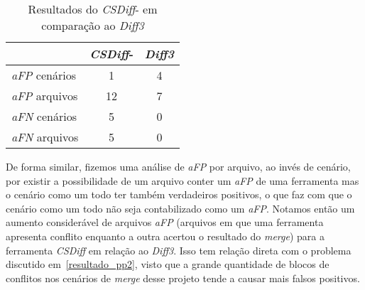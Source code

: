 \begin{table}[ht]
	\begin{center}
		\begin{tabular}{|l|c|c|}
			\hline
			\textbf{ }   & \textbf{\emph{CSDiff}-} & \textbf{\emph{Diff3}} \\
			\hline
			\emph{aFP} cenários & 1                & 4                     \\
			\emph{aFP} arquivos & 12               & 7                     \\
			\emph{aFN} cenários & 5                & 0                     \\
			\emph{aFN} arquivos & 5                & 0                     \\
			\hline
		\end{tabular}
	\end{center}
	\caption{Resultados do \emph{CSDiff}- em comparação ao \emph{Diff3}}\label{csdiff_minus_afp_afn}
\end{table}

De forma similar, fizemos uma análise de \emph{aFP} por arquivo, ao
invés de cenário, por existir a possibilidade de um arquivo conter
um \emph{aFP} de uma ferramenta mas o cenário como um todo ter também verdadeiros positivos, o que faz com que o cenário como um
todo não seja contabilizado como um \emph{aFP}. Notamos então um aumento considerável de
arquivos \emph{aFP} (arquivos em que uma ferramenta apresenta conflito enquanto a outra
acertou o resultado do \emph{merge}) para a ferramenta \emph{CSDiff} em relação ao \emph{Diff3}. Isso tem relação direta com o
problema discutido em~\ref{resultado_pp2}, visto que a
grande quantidade de blocos de conflitos nos cenários de \emph{merge} desse projeto
tende a causar mais falsos positivos.

